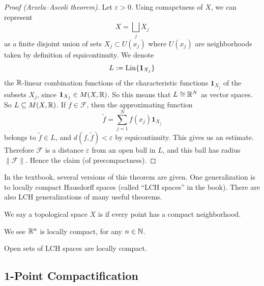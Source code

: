 \begin{proof}[Proof (Arzela--Ascoli theorem)]
Let $\varepsilon > 0$. Using comapctness of $X$, we can represent
\begin{equation}
X=\bigsqcup_{j}X_{j}
\end{equation}
as a finite disjoint union of sets $X_{j}\subset U(x_{j})$ where
$U(x_{j})$ are neighborhoods taken by definition of equicontinuity. We
denote
\begin{equation}
L:=\operatorname{Lin}\{\mathbf{1}_{X_{j}}\}
\end{equation}
the $\mathbb{R}$-linear combination functions of the characteristic functions
$\mathbf{1}_{X_{j}}$ of the subsets $X_{j}$, since
$\mathbf{1}_{X_{j}}\in M(X,\mathbb{R})$. So this means that $L\cong\mathbb{R}^{N}$ as
vector spaces. So $L\subseteq M(X,\mathbb{R})$. If $f\in\mathcal{F}$, then the
approximating function
\begin{equation}
\widetilde{f}=\sum^{N}_{j=1}f(x_{j})\mathbf{1}_{X_{j}}
\end{equation}
belongs to $\widetilde{f}\in L$, and $d(f,\widetilde{f})<\varepsilon$
by equicontinuity. This gives us an estimate. Therefore $\mathcal{F}$
is a distance $\varepsilon$ from an open ball in $L$, and this ball
has radius $\|\mathcal{F}\|$. Hence the claim (of precompactness).
\end{proof}

\begin{remark}
In the textbook, several versions of this theorem are given. One
generalization is to locally compact Hausdorff spaces (called ``LCH
spaces'' in the book). There are also LCH generalizations of many
useful theorems.
\end{remark}

\begin{definition}
We say a topological space $X$ is  if every
point has a compact neighborhood.
\end{definition}

\begin{example}
We see $\mathbb{R}^{n}$ is locally compact, for any $n\in\mathbb{N}$.
\end{example}

\begin{example}
Open sets of LCH spaces are locally compact.
\end{example}

\subsection{1-Point Compactification}

